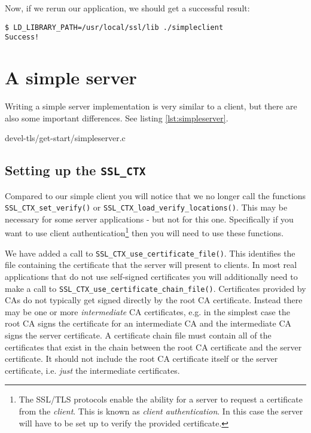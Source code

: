 Now, if we rerun our application, we should get a successful result:

\begin{verbatim}
$ LD_LIBRARY_PATH=/usr/local/ssl/lib ./simpleclient
Success!
\end{verbatim}

\section{A simple server}

Writing a simple server implementation is very similar to a client, but there 
are also some important differences. See listing \ref{lst:simpleserver}.


{devel-tls/get-start/simpleserver.c}

\subsection{Setting up the \texttt{SSL\_CTX}}
\label{sec:get-start-setup-ssl-ctx}

Compared to our simple client you will notice that we no longer call the 
functions \verb!SSL_CTX_set_verify()! or \verb!SSL_CTX_load_verify_locations()!.
This may
be necessary for some server applications - but not for this one. Specifically 
if you want to use client authentication\footnote{The SSL/TLS protocols enable 
the ability for a server to request a certificate from the \emph{client}. This 
is known as \emph{client authentication}. In this case the server will have to 
be set up to verify the provided certificate.} then you will need to use these 
functions.

We have added a call to \verb!SSL_CTX_use_certificate_file()!. This identifies 
the file containing the certificate that the server will present to clients. In 
most real applications that do not use self-signed certificates you will 
additionally need to make a call to 
\verb!SSL_CTX_use_certificate_chain_file()!. Certificates provided by CAs do 
not typically get signed directly by the root CA certificate. Instead there may 
be one or more \emph{intermediate} CA certificates, e.g. in the simplest case 
the root CA signs the certificate for an intermediate CA and the intermediate 
CA signs the server certificate. A certificate chain file must contain all of 
the certificates that exist in the chain between the root CA certificate and the
server certificate. It should not include the root CA certificate itself or the
server certificate, i.e. \emph{just} the intermediate certificates.

